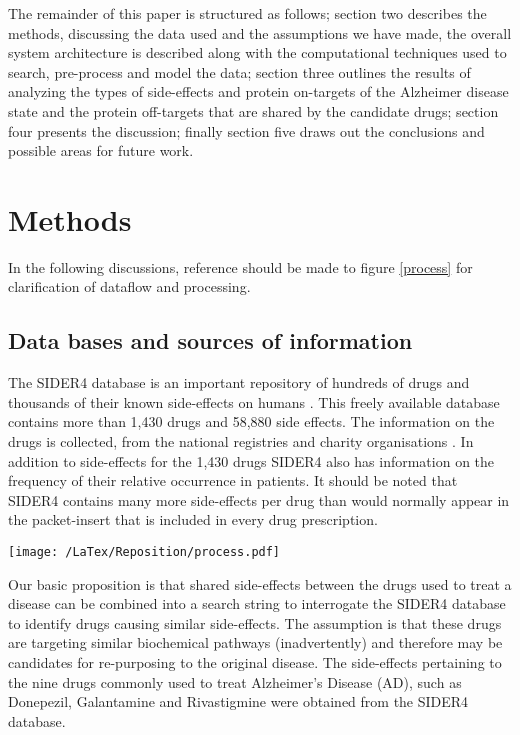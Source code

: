 \documentclass[preprint,12pt]{elsarticle}
\begin{document}
The remainder of this paper is structured as follows; section two describes the methods, discussing the data used and the assumptions we have made, the overall system architecture is described along with the computational techniques used to search, pre-process and model the data; section three outlines the  results of analyzing the types of side-effects and protein on-targets of the Alzheimer disease state and the protein off-targets that are shared by the candidate drugs; section four presents the discussion; finally section five draws out the conclusions and possible areas for future work.


\section{Methods}
In the following discussions, reference should be made to figure \ref{process} for clarification of dataflow and processing.

\subsection{Data bases and sources of information}
The SIDER4 database is an important repository of hundreds of drugs and thousands of their known side-effects on humans \cite{Kuhn2013}. This freely available database contains more than 1,430 drugs and 58,880 side effects. The information on the drugs is collected, from the national registries and charity organisations \cite{Kuhn2010}. In addition to side-effects for the 1,430 drugs SIDER4 also has information on the frequency of their relative occurrence in patients. It should be noted that SIDER4 contains many more side-effects per drug  than would normally appear in the packet-insert that is included in every drug prescription.  

\begin{figure*}[h]
  \begin{center}
	 \texttt{[image: /LaTex/Reposition/process.pdf]} %
  \end{center}
 \caption{Detailed step by step process diagram}
\label{process}
\end{figure*}

Our basic proposition is that shared side-effects between the drugs used to treat a disease can be combined into a search string to interrogate the SIDER4 database to identify drugs causing similar side-effects. The assumption is that these drugs are targeting similar biochemical pathways (inadvertently) and therefore may be candidates for re-purposing to the original disease. The side-effects pertaining to the nine drugs commonly used to treat Alzheimer's Disease (AD),  such as Donepezil, Galantamine and Rivastigmine were obtained from the SIDER4 database.
\end{document}
